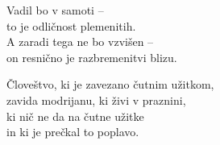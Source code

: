 Vadil bo v samoti --\\
to je odličnost plemenitih.\\
A zaradi tega ne bo vzvišen --\\
on resnično je razbremenitvi blizu.


\clearpage

Človeštvo, ki je zavezano čutnim užitkom,\\
zavida modrijanu, ki živi v praznini,\\
ki nič ne da na čutne užitke\\
in ki je prečkal to poplavo.

